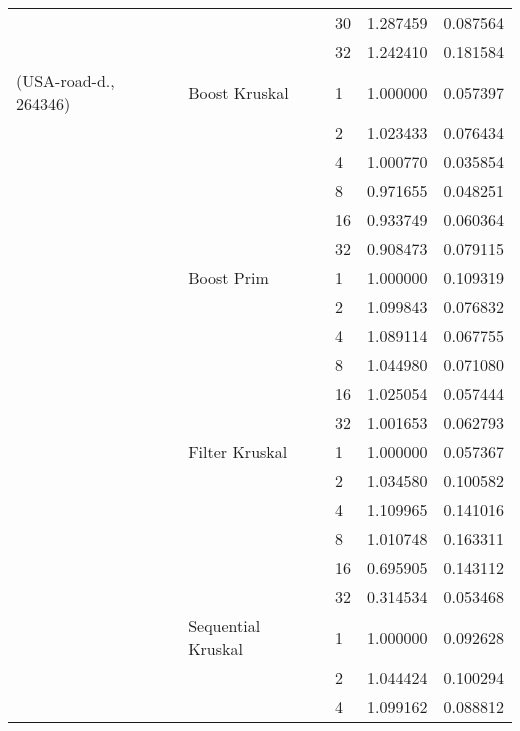 \begin{tabular}{lllrr}
                       &                    & 30 &  1.287459 &  0.087564 \\
                       &                    & 32 &  1.242410 &  0.181584 \\
(USA-road-d., 264346) & Boost Kruskal & 1  &  1.000000 &  0.057397 \\
                       &                    & 2  &  1.023433 &  0.076434 \\
                       &                    & 4  &  1.000770 &  0.035854 \\
                       &                    & 8  &  0.971655 &  0.048251 \\
                       &                    & 16 &  0.933749 &  0.060364 \\
                       &                    & 32 &  0.908473 &  0.079115 \\
                       & Boost Prim & 1  &  1.000000 &  0.109319 \\
                       &                    & 2  &  1.099843 &  0.076832 \\
                       &                    & 4  &  1.089114 &  0.067755 \\
                       &                    & 8  &  1.044980 &  0.071080 \\
                       &                    & 16 &  1.025054 &  0.057444 \\
                       &                    & 32 &  1.001653 &  0.062793 \\
                       & Filter Kruskal & 1  &  1.000000 &  0.057367 \\
                       &                    & 2  &  1.034580 &  0.100582 \\
                       &                    & 4  &  1.109965 &  0.141016 \\
                       &                    & 8  &  1.010748 &  0.163311 \\
                       &                    & 16 &  0.695905 &  0.143112 \\
                       &                    & 32 &  0.314534 &  0.053468 \\
                       & Sequential Kruskal & 1  &  1.000000 &  0.092628 \\
                       &                    & 2  &  1.044424 &  0.100294 \\
                       &                    & 4  &  1.099162 &  0.088812 \\

\end{tabular}
